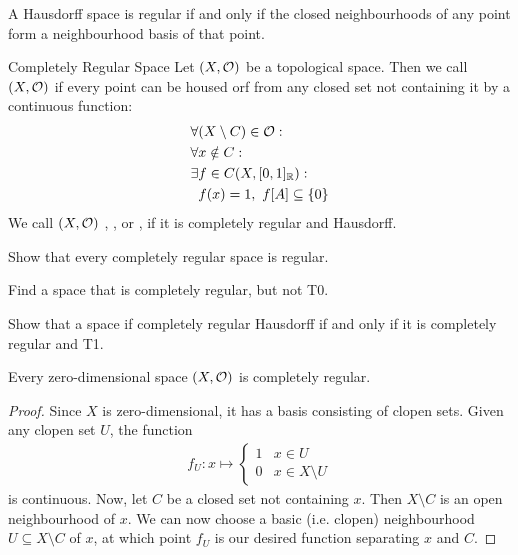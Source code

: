 \begin{theorem}
	\label{th:regularclosedneighbourhoods}
	A Hausdorff space is regular if and only if the closed neighbourhoods of any point form a neighbourhood basis of that point.
\end{theorem}
\begin{importantdefinition}{Completely Regular Space}{}
	Let $(X, \mathcal{O})$ be a topological space. Then we call $(X,\mathcal{O})$  if every point can be housed orf from any closed set not containing it by a continuous function:
	\begin{align*}
		\forall &(X \setminus C) \in \mathcal{O} :\\ 
		\forall &x \notin C :\\ 
		\exists &f \in C(X, [0,1]_{\mathbb{R}}) :\\ 
		&f(x) = 1,\ f[A] \subseteq \qty{0}
	\end{align*}
	We call $(X, \mathcal{O})$ , , or , if it is completely regular and Hausdorff.
\end{importantdefinition}
\begin{exercise}
	Show that every completely regular space is regular.
\end{exercise}	
\begin{exercise}
	Find a space that is completely regular, but not T0.
\end{exercise}
\begin{exercise}
	Show that a space if completely regular Hausdorff if and only if it is completely regular and T1.
\end{exercise}
\begin{theorem}
	Every zero-dimensional space $(X, \mathcal{O})$ is completely regular.
\end{theorem}
\begin{proof}
	Since $X$ is zero-dimensional, it has a basis consisting of clopen sets. Given any clopen set $U$, the function
	\begin{align*}
		f_U : x \mapsto \begin{cases}
			1 & x \in U\\
			0 & x \in X \setminus U
		\end{cases}
	\end{align*}
	is continuous. Now, let $C$ be a closed set not containing $x$. Then $X \setminus C$ is an open neighbourhood of $x$. We can now choose a basic (i.e. clopen) neighbourhood $U \subseteq X \setminus C$ of $x$, at which point $f_U$ is our desired function separating $x$ and $C$.
\end{proof}
